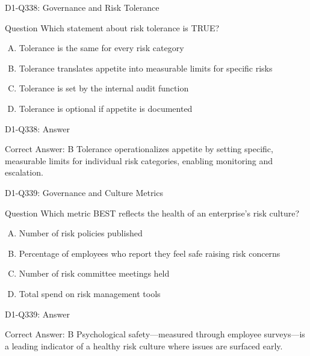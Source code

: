 \documentclass{beamer}
\begin{document}
\begin{frame}{D1-Q338: Governance and Risk Tolerance}
	\begin{block}{Question}
		Which statement about risk tolerance is TRUE?
	\end{block}
	\begin{enumerate}[(A)]
		\item Tolerance is the same for every risk category
		\item Tolerance translates appetite into measurable limits for specific risks
		\item Tolerance is set by the internal audit function
		\item Tolerance is optional if appetite is documented
	\end{enumerate}
\end{frame}
\begin{frame}{D1-Q338: Answer}
	\begin{block}{Correct Answer: B}
		Tolerance operationalizes appetite by setting specific, measurable limits for individual risk categories, enabling monitoring and escalation.
	\end{block}
\end{frame}

\begin{frame}{D1-Q339: Governance and Culture Metrics}
	\begin{block}{Question}
		Which metric BEST reflects the health of an enterprise's risk culture?
	\end{block}
	\begin{enumerate}[(A)]
		\item Number of risk policies published
		\item Percentage of employees who report they feel safe raising risk concerns
		\item Number of risk committee meetings held
		\item Total spend on risk management tools
	\end{enumerate}
\end{frame}
\begin{frame}{D1-Q339: Answer}
	\begin{block}{Correct Answer: B}
		Psychological safety—measured through employee surveys—is a leading indicator of a healthy risk culture where issues are surfaced early.
	\end{block}
\end{frame}
\end{document}
